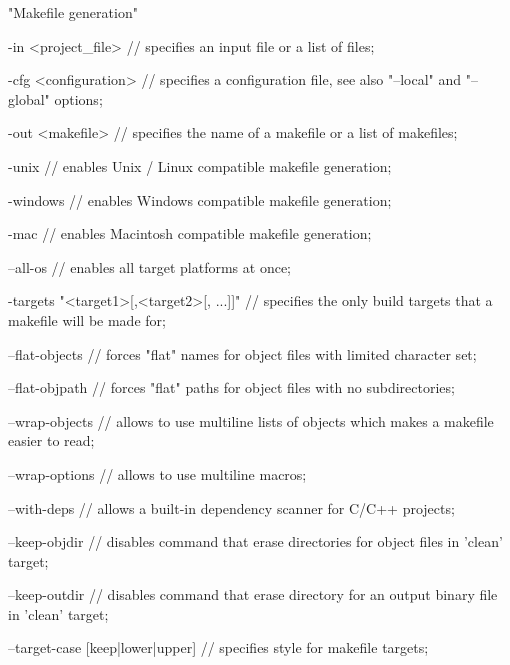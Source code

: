 \begin{code}
"Makefile generation"

    -in <project_file>   // specifies an input file or a list of files;

    -cfg <configuration> // specifies a configuration file, see also "--local"
                            and "--global" options;

    -out <makefile>      // specifies the name of a makefile or a list of
                            makefiles;

    -unix                // enables Unix / Linux compatible makefile generation;

    -windows             // enables Windows compatible makefile generation;

    -mac                 // enables Macintosh compatible makefile generation;

    --all-os             // enables all target platforms at once;

    -targets "<target1>[,<target2>[, ...]]" // specifies the only build targets
                                               that a makefile will be made for;

    --flat-objects       // forces "flat" names for object files with limited
                            character set;

    --flat-objpath       // forces "flat" paths for object files with no
                            subdirectories;

    --wrap-objects       // allows to use multiline lists of objects which
                            makes a makefile easier to read;

    --wrap-options       // allows to use multiline macros;

    --with-deps          // allows a built-in dependency scanner for C/C++
                            projects;

    --keep-objdir        // disables command that erase directories for
                            object files in 'clean' target;

    --keep-outdir        // disables command that erase directory for an
                            output binary file in 'clean' target;

    --target-case [keep|lower|upper] // specifies style for makefile targets;
\end{code}